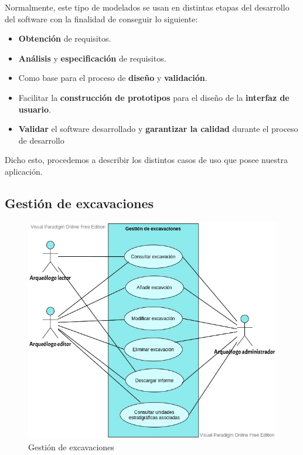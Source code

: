 Normalmente, este tipo de modelados se usan en distintas etapas del desarrollo del
software con la finalidad de conseguir lo siguiente:

    \begin{itemize}
        \item \textbf{Obtención} de requisitos.
        \item \textbf{Análisis} y \textbf{especificación} de requisitos.
        \item Como base para el proceso de \textbf{diseño} y \textbf{validación}.
        \item Facilitar la \textbf{construcción de prototipos} para el diseño de la
        \textbf{interfaz de usuario}.
        \item \textbf{Validar} el software desarrollado y \textbf{garantizar la calidad}
        durante el proceso de desarrollo
    \end{itemize}

Dicho esto, procedemos a describir los distintos casos de uso que posee nuestra aplicación.

\subsection{Gestión de excavaciones}
    \begin{figure}[H]
        \centering
        \includegraphics[scale=0.50]{imagenes/diagramas CU/excavation-UC.jpeg}
        \caption{Gestión de excavaciones}
        \label{fig:excavation-management}
    \end{figure}

